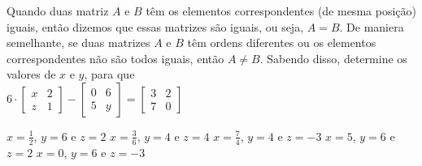 Quando duas matriz $A$ e $B$ têm os elementos correspondentes (de mesma posição) iguais, então dizemos que essas matrizes são iguais, ou seja, $A=B$. De maniera semelhante, se duas matrizes $A$ e $B$ têm ordens diferentes ou os elementos correspondentes não são todos iguais, então $A\neq B$. Sabendo disso, determine os valores de $x$ e $y$, para que\\$6\cdot \left[ \begin{array}{cc}
x & 2 \\
z & 1
\end{array} \right] - \left[ \begin{array}{cc}
0 & 6 \\
5 & y
\end{array} \right] = \left[ \begin{array}{cc}
3 & 2 \\
7 & 0
\end{array} \right]$

$x=\frac{1}{2}$, $y=6$ e $z=2$
$x=\frac{3}{6}$, $y=4$ e $z=4$
$x=\frac{7}{4}$, $y=4$ e $z=-3$
$x=5$, $y=6$ e $z=2$
$x=0$, $y=6$ e $z=-3$


